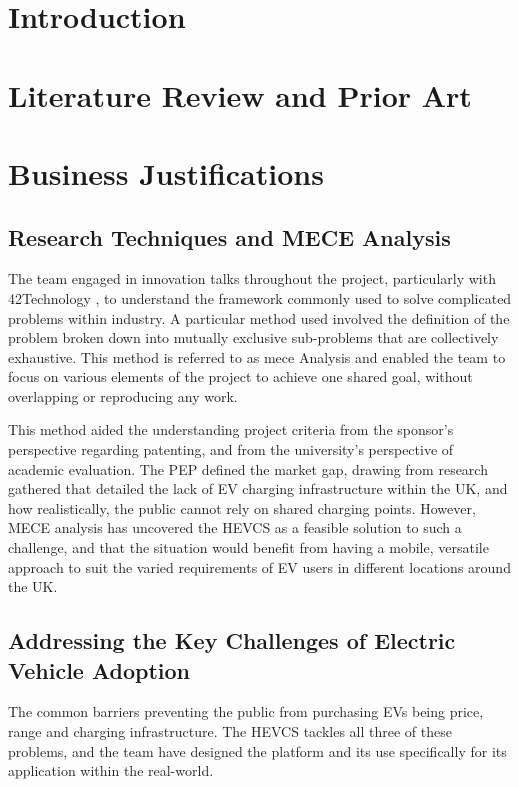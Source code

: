 \documentclass [12pt]{article}
\begin{document}
\section{Introduction}
\setcounter{page}{1}

\newpage
\section{Literature Review and Prior Art}


\newpage
\section{Business Justifications}

\subsection{Research Techniques and MECE Analysis}

The team engaged in innovation talks throughout the project, particularly with 42Technology \cite{42T}, to understand the framework commonly used to solve complicated problems within industry. A particular method used involved the definition of the problem broken down into mutually exclusive sub-problems that are collectively exhaustive. This method is referred to as \gls{mece} Analysis and enabled the team to focus on various elements of the project to achieve one shared goal, without overlapping or reproducing any work. 

This method aided the understanding project criteria from the sponsor’s perspective regarding patenting, and from the university’s perspective of academic evaluation. The PEP defined the market gap, drawing from research gathered that detailed the lack of EV charging infrastructure within the UK, and how realistically, the public cannot rely on shared charging points. However, MECE analysis has uncovered the HEVCS as a feasible solution to such a challenge, and that the situation would benefit from having a mobile, versatile approach to suit the varied requirements of EV users in different locations around the UK. 

\subsection{Addressing the Key Challenges of Electric Vehicle Adoption}

The common barriers preventing the public from purchasing EVs being price, range and charging infrastructure. The HEVCS tackles all three of these problems, and the team have designed the platform and its use specifically for its application within the real-world. 
\end{document}
